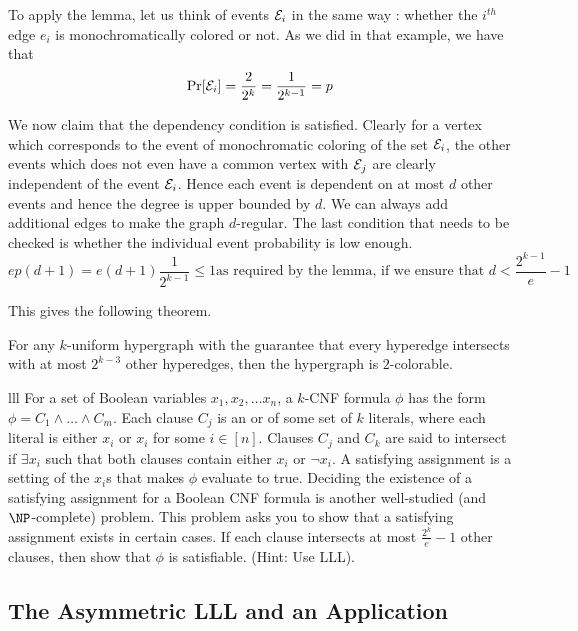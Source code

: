 To apply the lemma, let us think of events ${\cal E}_i$ in the same way : whether the $i^{th}$ edge $e_i$ is monochromatically colored or not. As we did in that example, we have that 
$$\Pr[{\cal E}_i] = \frac{2}{2^k} = \frac{1}{2^{k-1}} = p$$

We now claim that the dependency condition is satisfied. Clearly for a vertex which corresponds to the event of monochromatic coloring of the set ${\cal E}_i$, the other events which does not even have a common vertex with ${\cal E}_j$ are clearly independent of the event ${\cal E}_i$. Hence each event is dependent on at most $d$ other events and hence the degree is upper bounded by $d$. We can always add additional edges to make the graph $d$-regular. The last condition that needs to be checked is whether the individual event probability is low enough.
$$ep(d+1) = e(d+1)\frac{1}{2^{k-1}} \le 1 \textrm{as required by the lemma, if we ensure that $d < \frac{2^{k-1}}{e}-1$}$$

This gives the following theorem.

\begin{theorem}
For any $k$-uniform hypergraph with the guarantee that every hyperedge intersects with at most $2^{k-3}$ other hyperedges, then the hypergraph is $2$-colorable.
\end{theorem}
\begin{exercise-prob}
\begin{show-ps1}{lll}
For a set of Boolean variables $x_1, x_2, \ldots x_n$, a $k$-CNF formula $\phi$ has the form $\phi = C_1 \land \ldots \land C_m$. Each clause $C_j$ is an or of some set of $k$ literals, where each literal is either $x_i$ or $x_i$ for some $i \in [n]$. Clauses $C_j$ and $C_k$ are said to intersect if $\exists x_i$ such that both clauses contain either $x_i$ or $\lnot x_i$. A satisfying assignment is a setting of the $x_i$s that makes $\phi$ evaluate to true. Deciding the existence of a satisfying assignment for a Boolean CNF formula is another well-studied (and $\NP$-complete) problem. This problem asks you to show that a satisfying assignment exists in certain cases. If each clause intersects at most $\frac{2^k}{e}-1$ other clauses, then show that $\phi$ is satisfiable. (Hint: Use LLL).
\end{show-ps1}
\end{exercise-prob}

\subsection{The Asymmetric LLL and an Application}

